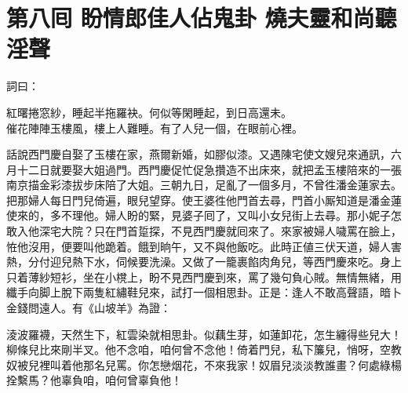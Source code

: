 
\chapter*{第八囘 盼情郎佳人佔鬼卦 燒夫靈和尚聽淫聲}


詞曰：

\begin{myquote} 
紅曙捲窓紗，睡起半拖羅袂。何似等閑睡起，到日高還未。\\催花陣陣玉樓風，樓上人難睡。有了人兒一個，在眼前心裡。
\end{myquote} 

話說西門慶自娶了玉樓在家，燕爾新婚，如膠似漆。又遇陳宅使文嫂兒來通訊，六月十二日就要娶大姐過門。西門慶促忙促急攢造不出床來，就把孟玉樓陪來的一張南京描金彩漆拔步床陪了大姐。三朝九日，足亂了一個多月，不曾徃潘金蓮家去。把那婦人每日門兒倚遍，眼兒望穿。使王婆徃他門首去尋，門首小厮知道是潘金蓮使來的，多不理他。婦人盼的緊，見婆子囘了，又叫小女兒街上去尋。那小妮子怎敢入他深宅大院？只在門首踅探，不見西門慶就囘來了。來家被婦人噦罵在臉上，恠他沒用，便要叫他跪着。餓到晌午，又不與他飯吃。此時正値三伏天道，婦人害熱，分付迎兒熱下水，伺候要洗澡。又做了一籠裹餡肉角兒，等西門慶來吃。身上只着薄紗短衫，坐在小櫈上，盼不見西門慶到來，罵了幾句負心賊。無情無緒，用纖手向脚上脫下兩隻紅繡鞋兒來，試打一個相思卦。正是：逢人不敢高聲語，暗卜金錢問遠人。有《山坡羊》為證：

\begin{myquote} 
淩波羅襪，天然生下，紅雲染就相思卦。似藕生芽，如蓮卸花，怎生纏得些兒大！柳條兒比來剛半叉。他不念咱，咱何曾不念他！倚着門兒，私下簾兒，悄呀，空教奴被兒裡叫着他那名兒罵。你怎戀烟花，不來我家！奴眉兒淡淡教誰畫？何處綠楊拴繫馬？他辜負咱，咱何曾辜負他！
\end{myquote} 


